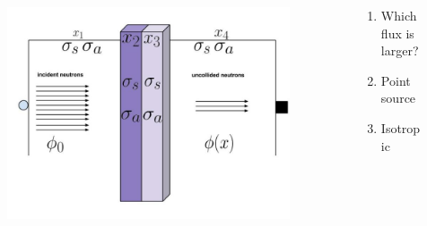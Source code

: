\documentclass[aspectratio=1610,pdftex,dvipsnames,compress,xcolor={dvipsnames}]{beamer}
\begin{document}
\addtocounter{framenumber}{-1} 
\begin{frame}{}
    \begin{columns}

        \begin{column}{0.75\textwidth}
            \begin{figure}
                \centering
                \includegraphics[width=0.95\textwidth]{shielding.jpg}
            \end{figure}
        \end{column}

        \begin{column}{0.25\textwidth}
            \begin{enumerate}[series=outerlist,topsep=0pt,itemsep=7pt,leftmargin=*,label=(\arabic*)]
                \item[]\small Which flux is larger?
                \item[]\small Point source
                \item[]\small Isotropic
            \end{enumerate}
        \end{column}

    \end{columns}
\end{frame}
\end{document}
